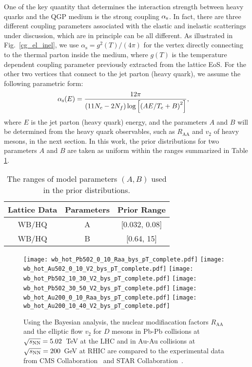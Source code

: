 \documentclass[aps,superscriptaddress,prc,twocolumn,nofootinbib]{revtex4}
\begin{document}
One of the key quantity that determines the interaction strength between heavy quarks and the QGP medium is the strong coupling $\alpha_{\rm s}$. In fact, there are three different coupling parameters associated with the elastic and inelastic scatterings under discussion, which are in principle can be all different. As illustrated in Fig.~\ref{cg_el_inel}, we use $\alpha_\mathrm{s}=g^2(T)/(4\pi)$ for the vertex directly connecting to the thermal parton inside the medium, where $g(T)$ is the temperature dependent coupling parameter previously extracted from the lattice EoS. For the other two vertices that connect to the jet parton (heavy quark), we assume the following parametric form:
\begin{align}
\label{eq:paraAlphas}
\alpha_{\rm s}(E)&=\frac{12 \pi}{(11N_c - 2N_f) \log\left[\left(A  E/ T_\mathrm{c} + B\right)^2\right]},
\end{align}
where $E$ is the jet parton (heavy quark) energy, and the parameters $A$ and $B$ will be determined from the heavy quark observables, such as $R_\mathrm{AA}$ and $v_2$ of heavy mesons, in the next section.
In this work, the prior distributions for two parameters $A$ and $B$ are taken as uniform within the ranges summarized in Table \ref{tab:3}.


\begin{table}[htb]
\label{tab:3}
\centering
\vspace{-5pt}
\begin{tabular}{c|c|c}
 \hline
 Lattice Data & Parameters & Prior Range  \\
 \hline
  WB/HQ  & A & [0.032, 0.08]    \\
  WB/HQ  & B & [0.64, 15]  \\
  \hline
\end{tabular}
	\caption{The ranges of model parameters $(A,B)$ used in the prior distributions.}
\end{table}


\begin{figure*}[tbh]
\texttt{[image: wb\_hot\_Pb502\_0\_10\_Raa\_bys\_pT\_complete.pdf]}
\texttt{[image: wb\_hot\_Au502\_0\_10\_V2\_bys\_pT\_complete.pdf]}
\texttt{[image: wb\_hot\_Pb502\_10\_30\_V2\_bys\_pT\_complete.pdf]}
\texttt{[image: wb\_hot\_Pb502\_30\_50\_V2\_bys\_pT\_complete.pdf]}
\texttt{[image: wb\_hot\_Au200\_0\_10\_Raa\_bys\_pT\_complete.pdf]}
\texttt{[image: wb\_hot\_Au200\_10\_40\_V2\_bys\_pT\_complete.pdf]}
	\caption{Using the Bayesian analysis, the nuclear modifiacation factors $R_\mathrm{AA}$ and the elliptic flow $v_2$ for $D$ mesons in Pb-Pb collisions at $\sqrt{s_{\rm NN}} = 5.02$~TeV at the LHC and in Au-Au collisions at $\sqrt{s_{\rm NN}}= 200$~GeV at RHIC are compared to the experimental data from CMS Collaboration~\cite{Sirunyan:2017xss, Sirunyan:2017plt} and STAR Collaboration~\cite{Adam:2018inb, Adamczyk:2017xur}.}
	\label{RAA-v2}
\end{figure*}
\end{document}
